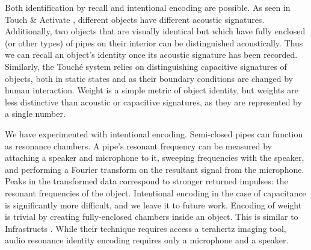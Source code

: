 Both identification by recall and intentional encoding are possible.  As seen in Touch \& Activate \cite{Ono-touchandactivate}, different objects have different acoustic signatures.  Additionally, two objects that are visually identical but which have fully enclosed (or other types) of pipes on their interior can be distinguished acoustically.  Thus we can recall an object's identity once its acoustic signature has been recorded.  Similarly, the Touch\'{e} system \cite{Sato-touche} relies on distinguishing capacitive signatures of objects, both in static states and as their boundary conditions are changed by human interaction.  Weight is a simple metric of object identity, but weights are less distinctive than acoustic or capacitive signatures, as they are represented by a single number.

We have experimented with intentional encoding.  Semi-closed pipes can function as resonance chambers.  A pipe's resonant frequency can be measured by attaching a speaker and microphone to it, sweeping frequencies with the speaker, and performing a Fourier transform on the resultant signal from the microphone.  Peaks in the transformed data correspond to stronger returned impulses: the resonant frequencies of the object.  Intentional encoding in the case of capacitance is significantly more difficult, and we leave it to future work.  Encoding of weight is trivial by creating fully-enclosed chambers inside an object.  This is similar to Infrastructs \cite{Willis-infrastructs}.  While their technique requires access a terahertz imaging tool, audio resonance identity encoding requires only a microphone and a speaker.



